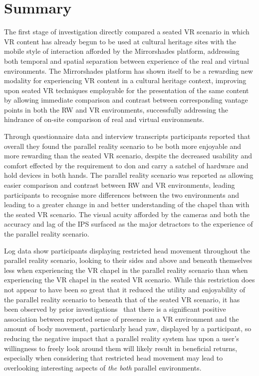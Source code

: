 
\section{Summary}

The first stage of investigation directly compared a seated VR scenario in which VR content has already begun to be used at cultural heritage sites with the mobile style of interaction afforded by the Mirrorshades platform, addressing both temporal and spatial separation between experience of the real and virtual environments. The Mirrorshades platform has shown itself to be a rewarding new modality for experiencing VR content in a cultural heritage context, improving upon seated VR techniques employable for the presentation of the same content by allowing immediate comparison and contrast between corresponding vantage points in both the RW and VR environments, successfully addressing the hindrance of on-site comparison of real and virtual environments.

Through questionnaire data and interview transcripts participants reported that overall they found the parallel reality scenario to be both more enjoyable and more rewarding than the seated VR scenario, despite the decreased usability and comfort effected by the requirement to don and carry a satchel of hardware and hold devices in both hands. The parallel reality scenario was reported as allowing easier comparison and contrast between RW and VR environments, leading participants to recognise more differences between the two environments and leading to a greater change in and better understanding of the chapel than with the seated VR scenario. The visual acuity afforded by the cameras and both the accuracy and lag of the IPS surfaced as the major detractors to the experience of the parallel reality scenario.

Log data show participants displaying restricted head movement throughout the parallel reality scenario, looking to their sides and above and beneath themselves less when experiencing the VR chapel in the parallel reality scenario than when experiencing the VR chapel in the seated VR scenario. While this restriction does not appear to have been so great that it reduced the utility and enjoyability of the parallel reality scenario to beneath that of the seated VR scenario, it has been observed by prior investigations~\cite{Slater1998} that there is a significant positive association between reported sense of presence in a VR environment and the amount of body movement, particularly head yaw, displayed by a participant, so reducing the negative impact that a parallel reality system has upon a user's willingness to freely look around them will likely result in beneficial returns, especially when considering that restricted head movement may lead to overlooking interesting aspects of \textit{the both} parallel environments.


